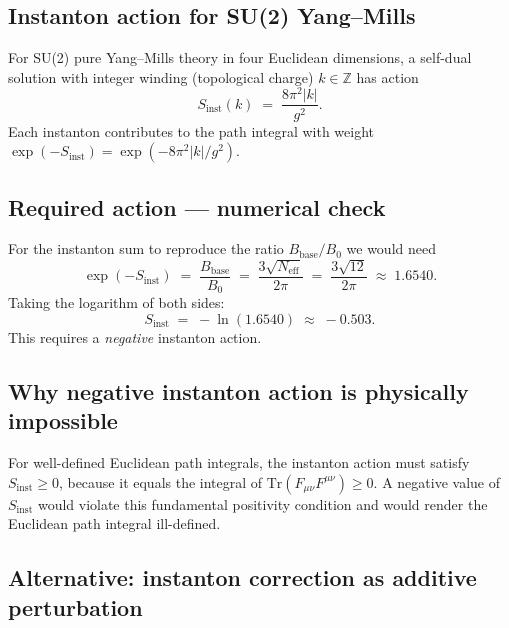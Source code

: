 \documentclass[11pt,a4paper]{article}
\theoremstyle{definition}
\theoremstyle{remark}
\begin{document}
\subsection{Instanton action for SU(2) Yang--Mills}

For SU(2) pure Yang--Mills theory in four Euclidean dimensions, a self-dual
solution with integer winding (topological charge) $k \in \mathbb{Z}$ has
action
\begin{equation}
  S_{\mathrm{inst}}(k) \;=\; \frac{8\pi^2 |k|}{g^2}.
  \label{eq:instanton_action}
\end{equation}
Each instanton contributes to the path integral with weight
$\exp(-S_{\mathrm{inst}}) = \exp(-8\pi^2|k|/g^2)$.

\subsection{Required action — numerical check}

For the instanton sum to reproduce the ratio $B_{\mathrm{base}}/B_0$ we would need
\begin{equation}
  \exp(-S_{\mathrm{inst}}) \;=\; \frac{B_{\mathrm{base}}}{B_0}
    \;=\; \frac{3\sqrt{N_{\mathrm{eff}}}}{2\pi}
    \;=\; \frac{3\sqrt{12}}{2\pi}
    \;\approx\; 1.6540.
  \label{eq:instanton_ratio_needed}
\end{equation}
Taking the logarithm of both sides:
\begin{equation}
  S_{\mathrm{inst}} \;=\; -\ln(1.6540) \;\approx\; -0.503.
  \label{eq:instanton_S_negative}
\end{equation}
This requires a \emph{negative} instanton action.

\subsection{Why negative instanton action is physically impossible}

For well-defined Euclidean path integrals, the instanton action must satisfy
$S_{\mathrm{inst}} \geq 0$, because it equals the integral of $\mathrm{Tr}(F_{\mu\nu}F^{\mu\nu}) \geq 0$.
A negative value of $S_{\mathrm{inst}}$ would violate this fundamental positivity
condition and would render the Euclidean path integral ill-defined.

\subsection{Alternative: instanton correction as additive perturbation}
\end{document}
